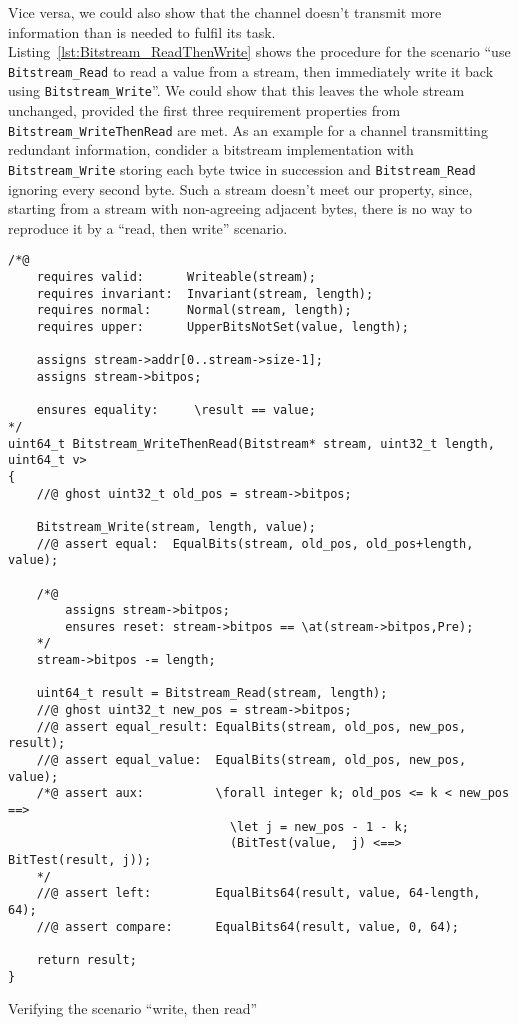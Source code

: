 Vice versa, we could also show that the channel doesn't transmit more
information than is needed to fulfil its task.
%
Listing~\ref{lst:Bitstream_ReadThenWrite}
shows the procedure for the scenario ``use \lstinline{Bitstream_Read}
to read a value from a stream, then immediately write it back using
\lstinline{Bitstream_Write}''.
%
We could show that this leaves the
whole stream unchanged, provided the first three requirement properties
from \lstinline{Bitstream_WriteThenRead} are met.
%
As an example for a channel transmitting redundant information,
condider
a bitstream implementation
with \lstinline{Bitstream_Write}
storing each byte twice in succession and \lstinline{Bitstream_Read}
ignoring every second byte.
%
Such a stream doesn't meet our property, since, 
starting from a stream with non-agreeing adjacent bytes, there is no
way to reproduce it by a ``read, then write'' scenario.






\begin{listing}[hbt]
\begin{minipage}{0.99\textwidth}
\begin{lstlisting}[style=acsl-block]
/*@
    requires valid:      Writeable(stream);
    requires invariant:  Invariant(stream, length);
    requires normal:     Normal(stream, length);
    requires upper:      UpperBitsNotSet(value, length);

    assigns stream->addr[0..stream->size-1];
    assigns stream->bitpos;

    ensures equality:     \result == value;
*/
uint64_t Bitstream_WriteThenRead(Bitstream* stream, uint32_t length, uint64_t v>
{
    //@ ghost uint32_t old_pos = stream->bitpos;

    Bitstream_Write(stream, length, value);
    //@ assert equal:  EqualBits(stream, old_pos, old_pos+length, value);

    /*@ 
        assigns stream->bitpos;
        ensures reset: stream->bitpos == \at(stream->bitpos,Pre);
    */
    stream->bitpos -= length;

    uint64_t result = Bitstream_Read(stream, length);
    //@ ghost uint32_t new_pos = stream->bitpos;
    //@ assert equal_result: EqualBits(stream, old_pos, new_pos, result);
    //@ assert equal_value:  EqualBits(stream, old_pos, new_pos, value);
    /*@ assert aux:          \forall integer k; old_pos <= k < new_pos ==>
                               \let j = new_pos - 1 - k;
                               (BitTest(value,  j) <==> BitTest(result, j));
    */
    //@ assert left:         EqualBits64(result, value, 64-length, 64);
    //@ assert compare:      EqualBits64(result, value, 0, 64);

    return result;
}
\end{lstlisting}
\end{minipage}
\caption{\label{lst:Bitstream_WriteThenRead}
	Verifying the scenario ``write, then read'' }
\end{listing}









